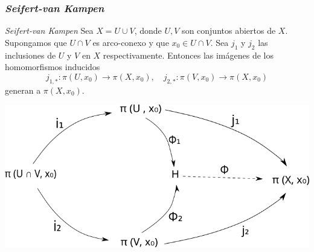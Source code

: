 \documentclass[xetex,mathserif,serif]{beamer}
\newcommand{\vank}{\emph{Seifert-van Kampen} }
\begin{document}
  \begin{frame}
    \frametitle{\vank}
    \begin{block}{\vank}
      Sea \(X = U \cup V\), donde \(U,V\) son conjuntos abiertos de \(X\).
      Supongamos que \(U \cap V\) es arco-conexo y que \(x_0 \in U \cap V\).
      Sea \(j_1\) y \(j_2\) las inclusiones de \(U\) y \(V\) en \(X\)
      respectivamente. Entonces las imágenes de los homomorfismos inducidos
      \[ j_{1,*} : \pi (U, x_0) \to \pi (X, x_0), \quad j_{2,*} : \pi
      (V, x_0) \to \pi (X, x_0) \]
      generan a \(\pi (X,x_0)\).

      \begin{center}
        \includegraphics[scale=.35]{../tesis/imagenes/van.png}
      \end{center}
    \end{block}
  \end{frame}
\end{document}
